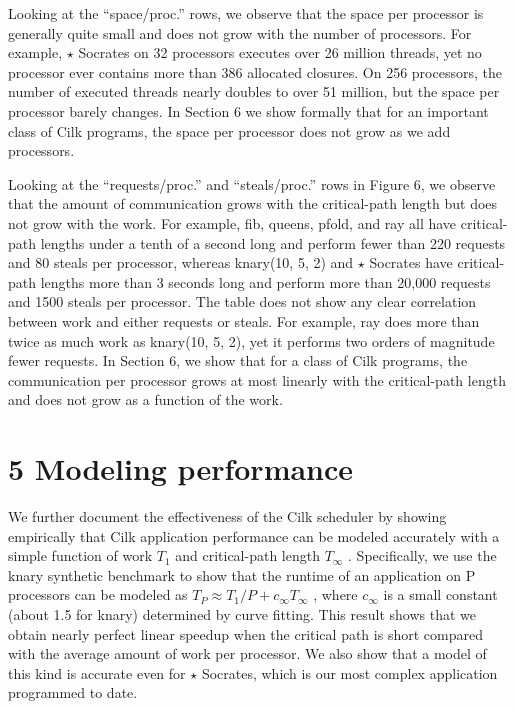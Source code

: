 \documentclass[
]{article}
\begin{document}
Looking at the ``space/proc.'' rows, we observe that the space per
processor is generally quite small and does not grow with the number of
processors. For example, \(\star\) Socrates on 32 processors executes
over 26 million threads, yet no processor ever contains more than 386
allocated closures. On 256 processors, the number of executed threads
nearly doubles to over 51 million, but the space per processor barely
changes. In Section 6 we show formally that for an important class of
Cilk programs, the space per processor does not grow as we add
processors.

Looking at the ``requests/proc.'' and ``steals/proc.'' rows in Figure 6,
we observe that the amount of communication grows with the critical-path
length but does not grow with the work. For example, fib, queens, pfold,
and ray all have critical-path lengths under a tenth of a second long
and perform fewer than 220 requests and 80 steals per processor, whereas
knary(10, 5, 2) and \(\star\) Socrates have critical-path lengths more
than 3 seconds long and perform more than 20,000 requests and 1500
steals per processor. The table does not show any clear correlation
between work and either requests or steals. For example, ray does more
than twice as much work as knary(10, 5, 2), yet it performs two orders
of magnitude fewer requests. In Section 6, we show that for a class of
Cilk programs, the communication per processor grows at most linearly
with the critical-path length and does not grow as a function of the
work.

\section{5 Modeling performance}\label{modeling-performance}

We further document the effectiveness of the Cilk scheduler by showing
empirically that Cilk application performance can be modeled accurately
with a simple function of work \(T_{1}\) and critical-path length
\(T_{\infty}\) . Specifically, we use the knary synthetic benchmark to
show that the runtime of an application on P processors can be modeled
as \(T_{P} \approx T_{1}/P + c_{\infty}T_{\infty}\) , where
\(c_{\infty}\) is a small constant (about 1.5 for knary) determined by
curve fitting. This result shows that we obtain nearly perfect linear
speedup when the critical path is short compared with the average amount
of work per processor. We also show that a model of this kind is
accurate even for \(\star\) Socrates, which is our most complex
application programmed to date.
\end{document}
